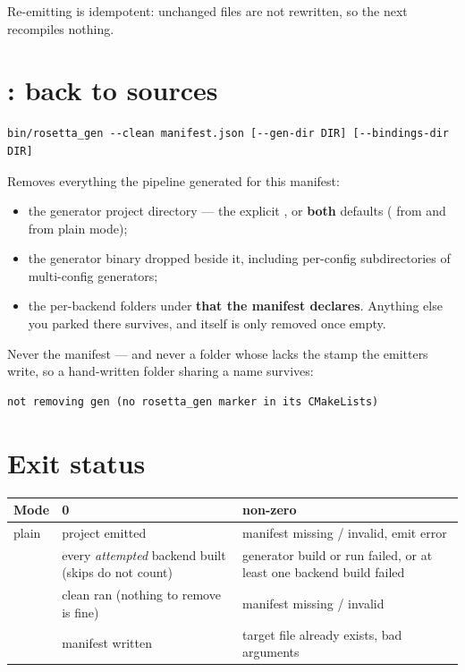 Re-emitting is idempotent: unchanged files are not rewritten, so the next
 recompiles nothing.

\section{: back to sources}

\begin{lstlisting}[style=sh]
bin/rosetta_gen --clean manifest.json [--gen-dir DIR] [--bindings-dir DIR]
\end{lstlisting}

Removes everything the pipeline generated for this manifest:

\begin{itemize}
  \item the generator project directory --- the explicit , or
    \textbf{both} defaults ( from  and
     from plain mode);
  \item the generator binary dropped beside it, including per-config
    subdirectories of multi-config generators;
  \item the per-backend folders under  \textbf{that the manifest
    declares}. Anything else you parked there survives, and 
    itself is only removed once empty.
\end{itemize}

Never the manifest --- and never a folder whose  lacks the
 stamp the emitters write, so a hand-written folder
sharing a name survives:

\begin{lstlisting}[style=plain]
not removing gen (no rosetta_gen marker in its CMakeLists)
\end{lstlisting}

\section{Exit status}

\begin{center}
\small
\begin{tabular}{@{}lL{4.6cm}L{5.6cm}@{}}
\toprule
\textbf{Mode} & \textbf{0} & \textbf{non-zero} \\
\midrule
plain & project emitted & manifest missing / invalid, emit error \\
 & every \emph{attempted} backend built (skips do not count) &
  generator build or run failed, or at least one backend build failed \\
 & clean ran (nothing to remove is fine) &
  manifest missing / invalid \\
 & manifest written & target file already exists, bad arguments \\
\bottomrule
\end{tabular}
\end{center}
